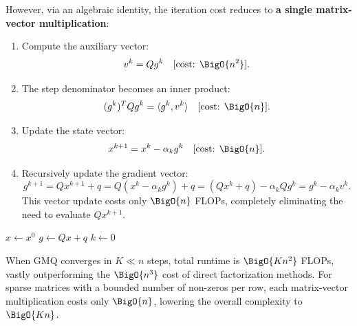 However, via an algebraic identity, the iteration cost reduces to \textbf{a single matrix-vector multiplication}:
\begin{enumerate}
    \item Compute the auxiliary vector:
    \begin{equation}
        v^k = Q g^k \quad [\text{cost: } \BigO{n^2}].
    \end{equation}
    \item The step denominator becomes an inner product:
    \begin{equation}
        (g^k)^T Q g^k = \langle g^k, v^k \rangle \quad [\text{cost: } \BigO{n}].
    \end{equation}
    \item Update the state vector:
    \begin{equation}
        x^{k+1} = x^k - \alpha_k g^k \quad [\text{cost: } \BigO{n}].
    \end{equation}
    \item Recursively update the gradient vector:
    \begin{equation}
        g^{k+1} = Q x^{k+1} + q = Q(x^k - \alpha_k g^k) + q = (Q x^k + q) - \alpha_k Q g^k = g^k - \alpha_k v^k.
    \end{equation}
    This vector update costs only $\BigO{n}$ FLOPs, completely eliminating the need to evaluate $Q x^{k+1}$.
\end{enumerate}

\begin{algorithm}[H]
\caption{Gradient Method for Quadratic Functions (Optimized GMQ)}
\label{alg:optimized-gmq-en}
$x \gets x^0$\;
$g \gets Q x + q$\;
$k \gets 0$\;
\end{algorithm}

When GMQ converges in $K \ll n$ steps, total runtime is $\BigO{K n^2}$ FLOPs, vastly outperforming the $\BigO{n^3}$ cost of direct factorization methods. For sparse matrices with a bounded number of non-zeros per row, each matrix-vector multiplication costs only $\BigO{n}$, lowering the overall complexity to $\BigO{K n}$.


